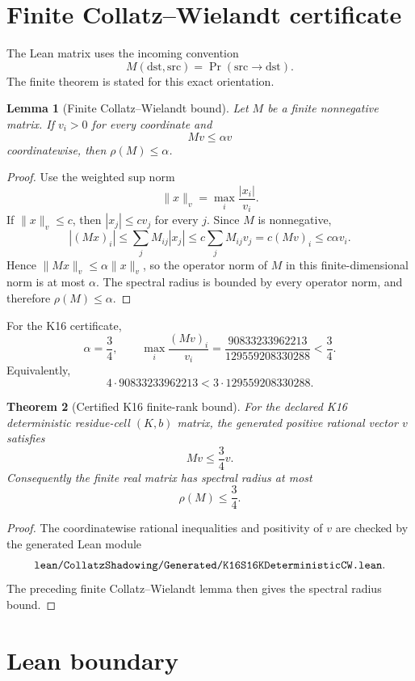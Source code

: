 \documentclass[11pt,a4paper]{article}
\newcommand{\ttbr}[1]{\ifmmode\text{\texttt{\detokenize{#1}}}\else\texttt{\detokenize{#1}}\fi}
\newcommand{\rhoM}{\rho}
\newtheorem{theorem}{Theorem}
\newtheorem{lemma}[theorem]{Lemma}
\begin{document}
\section{Finite Collatz--Wielandt certificate}

The Lean matrix uses the incoming convention
\[
  M(\mathrm{dst},\mathrm{src})
  =
  \Pr(\mathrm{src}\to\mathrm{dst}).
\]
The finite theorem is stated for this exact orientation.

\begin{lemma}[Finite Collatz--Wielandt bound]
Let \(M\) be a finite nonnegative matrix.  If \(v_i>0\) for every
coordinate and
\[
  Mv \leq \alpha v
\]
coordinatewise, then \(\rhoM(M)\leq \alpha\).
\end{lemma}

\begin{proof}
Use the weighted sup norm
\[
  \|x\|_v=\max_i \frac{|x_i|}{v_i}.
\]
If \(\|x\|_v\leq c\), then \(|x_j|\leq c v_j\) for every \(j\).
Since \(M\) is nonnegative,
\[
  |(Mx)_i|
  \leq \sum_j M_{ij}|x_j|
  \leq c\sum_j M_{ij}v_j
  = c(Mv)_i
  \leq c\alpha v_i.
\]
Hence \(\|Mx\|_v\leq \alpha\|x\|_v\), so the operator norm of \(M\) in
this finite-dimensional norm is at most \(\alpha\).  The spectral radius
is bounded by every operator norm, and therefore \(\rhoM(M)\leq\alpha\).
\end{proof}

For the K16 certificate,
\[
  \alpha=\frac34,
  \qquad
  \max_i\frac{(Mv)_i}{v_i}
  =
  \frac{90833233962213}{129559208330288}
  < \frac34.
\]
Equivalently,
\[
  4\cdot 90833233962213
  <
  3\cdot 129559208330288.
\]

\begin{theorem}[Certified K16 finite-rank bound]
For the declared K16 deterministic residue-cell \((K,b)\) matrix,
the generated positive rational vector \(v\) satisfies
\[
  Mv \leq \frac34 v.
\]
Consequently the finite real matrix has spectral radius at most
\[
  \rhoM(M)\leq\frac34.
\]
\end{theorem}

\begin{proof}
The coordinatewise rational inequalities and positivity of \(v\) are
checked by the generated Lean module
\[
\ttbr{lean/CollatzShadowing/Generated/K16S16KDeterministicCW.lean}.
\]
The preceding finite Collatz--Wielandt lemma then gives the spectral
radius bound.
\end{proof}

\section{Lean boundary}
\end{document}
